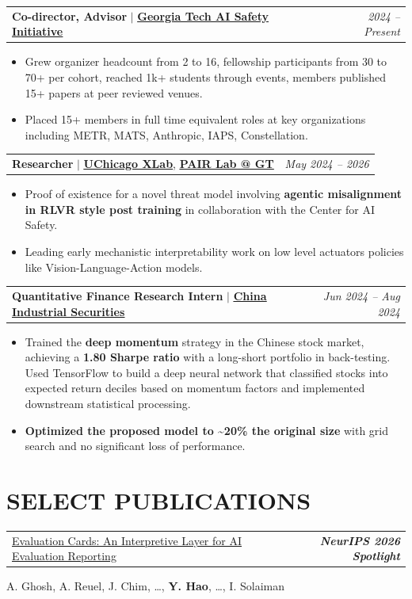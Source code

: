 \documentclass[11pt,letterpaper]{article}
\makeatletter
\newcommand{\ulink}[2]{\href{#1}{\underline{#2}}}
\newcommand{\entry}[2]{%
  \noindent\begin{tabular*}{\textwidth}{@{}l@{\extracolsep{\fill}}r@{}}%
    #1 & #2%
  \end{tabular*}\par\vspace{0.5pt}}
\newcommand{\role}[4]{\entry{\textbf{#1} $\mid$ \ulink{#3}{\textbf{#2}}}{\textit{#4}}}
\newcommand{\pub}[4]{%
  \entry{\ulink{#2}{#1}}{\textit{\textbf{#3}}}%
  #4\par\vspace{3pt}}
\newenvironment{items}
  {\begin{itemize}[leftmargin=1.4em,topsep=0pt,partopsep=0pt,parsep=0pt,itemsep=0pt,label=\textbullet]}
  {\end{itemize}\vspace{1.5pt}}
\makeatother
\begin{document}
\role{Co-director, Advisor}{Georgia Tech AI Safety Initiative}{https://aisi.dev}{2024 -- Present}
\begin{items}
  \item Grew organizer headcount from 2 to 16, fellowship participants from 30 to 70+ per cohort, reached 1k+ students through events, members published 15+ papers at peer reviewed venues.
  \item Placed 15+ members in full time equivalent roles at key organizations including METR, MATS, Anthropic, IAPS, Constellation.
\end{items}

\entry{\textbf{Researcher} $\mid$ \ulink{https://xrisk.uchicago.edu/}{\textbf{UChicago XLab}}, \ulink{https://www.pair.toronto.edu/}{\textbf{PAIR Lab @ GT}}}{\textit{May 2024 -- 2026}}
\begin{items}
  \item Proof of existence for a novel threat model involving \textbf{agentic misalignment in RLVR style post training} in collaboration with the Center for AI Safety.
  \item Leading early mechanistic interpretability work on low level actuators policies like Vision-Language-Action models.
\end{items}

\role{Quantitative Finance Research Intern}{China Industrial Securities}{https://www.xyzq.com/}{Jun 2024 -- Aug 2024}
\begin{items}
  \item Trained the \textbf{deep momentum} strategy in the Chinese stock market, achieving a \textbf{1.80 Sharpe ratio} with a long-short portfolio in back-testing. Used TensorFlow to build a deep neural network that classified stocks into expected return deciles based on momentum factors and implemented downstream statistical processing.
  \item \textbf{Optimized the proposed model to \textasciitilde20\% the original size} with grid search and no significant loss of performance.
\end{items}

\section*{SELECT PUBLICATIONS}

\pub{Evaluation Cards: An Interpretive Layer for AI Evaluation Reporting}{https://arxiv.org/abs/2606.09809}{NeurIPS 2026 Spotlight}
  {A. Ghosh, A. Reuel, J. Chim, \ldots, \textbf{Y. Hao}, \ldots, I. Solaiman}
\end{document}
